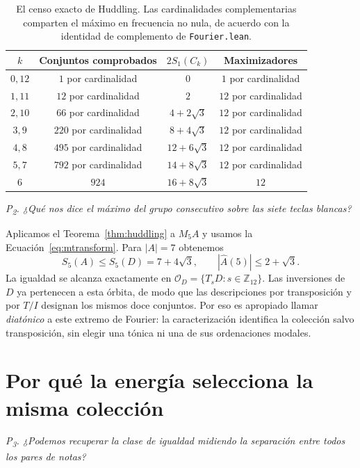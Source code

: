 \documentclass[11pt]{article}
\newcommand{\lean}[1]{\texttt{#1}}
\newcommand{\Ztwelve}{\mathbb{Z}_{12}}
\newcommand{\Ahat}{\widehat A}
\newcommand{\question}[1]{\smallskip\noindent\textit{#1}\smallskip}
\newcommand{\orb}{\mathcal O_D}
\begin{document}
\begin{table}[!htb]\centering
{}
\begin{tabular}{@{}cccc@{}}\toprule
\rowcolor{ctA!22}
$k$ & Conjuntos comprobados & $2S_1(C_k)$ & Maximizadores\\\midrule
$0,12$ & $1$ por cardinalidad & $0$ & $1$ por cardinalidad\\
$1,11$ & $12$ por cardinalidad & $2$ & $12$ por cardinalidad\\
$2,10$ & $66$ por cardinalidad & $4+2\sqrt3$ & $12$ por cardinalidad\\
$3,9$ & $220$ por cardinalidad & $8+4\sqrt3$ & $12$ por cardinalidad\\
$4,8$ & $495$ por cardinalidad & $12+6\sqrt3$ & $12$ por cardinalidad\\
$5,7$ & $792$ por cardinalidad & $14+8\sqrt3$ & $12$ por cardinalidad\\
$6$ & $924$ & $16+8\sqrt3$ & $12$\\\bottomrule
\end{tabular}
\caption{El censo exacto de Huddling. Las cardinalidades complementarias comparten el
máximo en frecuencia no nula, de acuerdo con la identidad de complemento de \lean{Fourier.lean}.}
\label{tab:huddling}
\end{table}

\question{P\textsubscript{2}. ¿Qué nos dice el máximo del grupo consecutivo sobre las siete teclas blancas?}

Aplicamos el Teorema~\ref{thm:huddling} a $M_5A$ y usamos la
Ecuación~\eqref{eq:mtransform}. Para $|A|=7$ obtenemos
\begin{equation}\label{eq:diatonicmax}
 S_5(A)\le S_5(D)=7+4\sqrt3,
 \qquad |\Ahat(5)|\le2+\sqrt3.
\end{equation}
La igualdad se alcanza exactamente en $\orb=\{T_sD:s\in\Ztwelve\}$.
Las inversiones de $D$ ya pertenecen a esta órbita, de modo que las descripciones por
transposición y por $T/I$ designan los mismos doce conjuntos. Por eso es apropiado
llamar \emph{diatónico} a este extremo de Fourier: la caracterización identifica la
colección salvo transposición, sin elegir una tónica ni una de sus ordenaciones modales.

\section{Por qué la energía selecciona la misma colección}\label{sec:energy}

\question{P\textsubscript{3}. ¿Podemos recuperar la clase de igualdad midiendo la separación
entre todos los pares de notas?}
\end{document}
